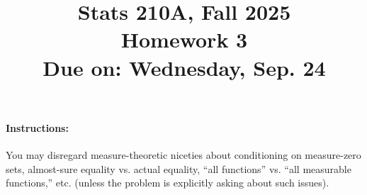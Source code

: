 \documentclass{article}
\theoremstyle{definition}
\begin{document}
\title{Stats 210A, Fall 2025\\
  Homework 3 \\
  {\large {\bf Due on}: Wednesday, Sep. 24}}
\date{}

\maketitle

\paragraph{Instructions:} You may disregard measure-theoretic niceties about conditioning on measure-zero sets, almost-sure equality vs. actual equality, ``all functions'' vs. ``all measurable functions,'' etc. (unless the problem is explicitly asking about such issues).
\end{document}
